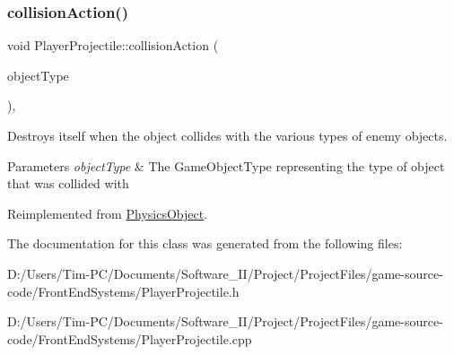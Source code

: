 \subsubsection{\texorpdfstring{collision\+Action()}{collisionAction()}}
{\footnotesize\ttfamily void Player\+Projectile\+::collision\+Action (\begin{DoxyParamCaption}\item[{const Game\+Object\+Type \&}]{object\+Type }\end{DoxyParamCaption})\hspace{0.3cm}{\ttfamily [override]}, {\ttfamily [virtual]}}



Destroys itself when the object collides with the various types of enemy objects. 


\begin{DoxyParams}{Parameters}
{\em object\+Type} & The Game\+Object\+Type representing the type of object that was collided with \\
\hline
\end{DoxyParams}


Reimplemented from \hyperlink{class_physics_object_a16163f4e5bf781b3814d024c9f44a276}{Physics\+Object}.



The documentation for this class was generated from the following files\+:\begin{DoxyCompactItemize}
\item 
D\+:/\+Users/\+Tim-\/\+P\+C/\+Documents/\+Software\+\_\+\+I\+I/\+Project/\+Project\+Files/game-\/source-\/code/\+Front\+End\+Systems/Player\+Projectile.\+h\item 
D\+:/\+Users/\+Tim-\/\+P\+C/\+Documents/\+Software\+\_\+\+I\+I/\+Project/\+Project\+Files/game-\/source-\/code/\+Front\+End\+Systems/Player\+Projectile.\+cpp\end{DoxyCompactItemize}

